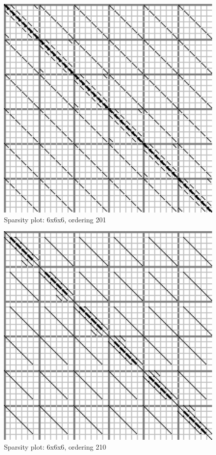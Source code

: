 \documentclass[10pt]{article}
\begin{document}
\begin{multicols}{2}
\begin{figure}[H]
	\centering
	\includegraphics[width=\spwidth]{../img/sparsity/int_hq_6x6x6_201.png}
	\caption{Sparsity plot: 6x6x6, ordering 201 }
\end{figure}

\begin{figure}[H]
	\centering
	\includegraphics[width=\spwidth]{../img/sparsity/int_hq_6x6x6_210.png}
	\caption{Sparsity plot: 6x6x6, ordering 210 }
\end{figure}


\end{multicols}
\end{document}
